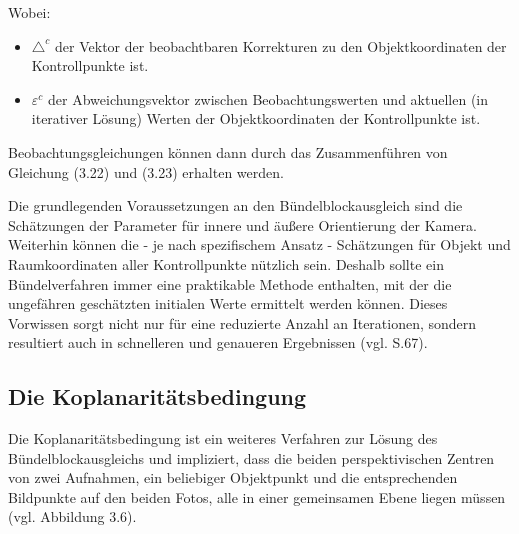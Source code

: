 Wobei:

\begin{itemize}
\item $\triangle^c$ der Vektor der beobachtbaren Korrekturen zu den Objektkoordinaten der Kontrollpunkte ist.

\item $\varepsilon^c$ der Abweichungsvektor zwischen Beobachtungswerten und aktuellen (in iterativer Lösung) Werten der Objektkoordinaten der Kontrollpunkte ist.

\end{itemize}

Beobachtungsgleichungen können dann durch das Zusammenführen von Gleichung (3.22) und (3.23) erhalten werden. 

Die grundlegenden Voraussetzungen an den Bündelblockausgleich sind die Schätzungen der Parameter für innere und äußere Orientierung der Kamera. Weiterhin können die - je nach spezifischem Ansatz - Schätzungen für Objekt und Raumkoordinaten aller Kontrollpunkte nützlich sein. Deshalb sollte ein Bündelverfahren immer eine praktikable Methode enthalten, mit der die ungefähren geschätzten initialen Werte ermittelt werden können. Dieses Vorwissen sorgt nicht nur für eine reduzierte Anzahl an Iterationen, sondern resultiert auch in schnelleren und genaueren Ergebnissen (vgl. \cite{comparative_conditions_study} S.67).


\subsection{Die Koplanaritätsbedingung}

Die Koplanaritätsbedingung ist ein weiteres Verfahren zur Lösung des Bündelblockausgleichs und impliziert, dass die beiden perspektivischen Zentren von zwei Aufnahmen, ein beliebiger Objektpunkt und die entsprechenden Bildpunkte auf den beiden Fotos, alle in einer gemeinsamen Ebene liegen müssen (vgl. Abbildung 3.6). 

